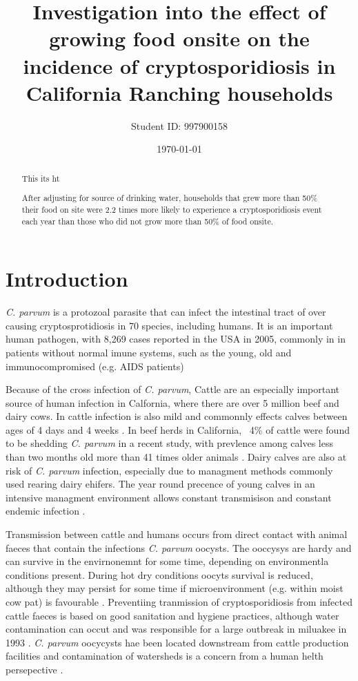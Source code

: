 \documentclass[12pt]{article}
\title{Investigation into the effect of growing food onsite on the incidence of cryptosporidiosis in California Ranching households}
\author{Student ID: 997900158}
\date{\today}
\begin{document}
	\maketitle
	\begin{abstract}
		This its ht 

		After adjusting for source of drinking water, households that grew more than 50\% their food  on site were 2.2 times more likely to experience a cryptosporidiosis event each year than those who did not grow more than 50\% of food onsite.

	\end{abstract}

\onehalfspace
	\section{Introduction} 
	\emph{C. parvum} is a protozoal parasite that can infect the intestinal tract of over causing cryptosprotidiosis in  70 species, \cite{Casemore1997} including humans.
	It is an important human pathogen, with 8,269 cases reported in the USA in 2005, commonly in in patients without normal imune systems, such as the young, old and immunocompromised (e.g. AIDS patients) \cite{Yoder2007}


	Because of the cross infection of \emph{C. parvum}, Cattle are an especially important source of human infection in Calfornia, where there are over 5 million beef and dairy cows. \cite{WesternFarm}
	In cattle infection is also mild and commonnly effects calves between ages of 4 days and 4 weeks \cite{malmo2010}. 
	In beef herds in California, ~4\% of cattle were found to be shedding \emph{C. parvum} in a recent study, with prevlence among calves less than two months old more than 41 times older animals \cite{Atwill1999a}.
	Dairy calves are also at risk of \emph{C. parvum} infection, especially due to managment methods commonly used rearing dairy ehifers. The year round precence of young calves in an intensive managment environment allows constant transmisison and constant endemic infection .\cite{Atwill1998}
	
	
	Transmission between cattle and humans occurs from direct contact with animal faeces that contain the infections \emph{C. parvum} oocysts\cite{malmo2010}.
	The ooccysys are hardy and can survive in the envirnonemnt for some time, depending on environmentla conditions present. 
	During hot dry conditions oocyts survival is reduced, although they may persist for some time if microenvironment (e.g. within moist cow pat) is favourable \cite{Robertson1992}.
	Preventiing tranmission of cryptosporidiosis from infected cattle faeces is based on good sanitation and hygiene practices\cite{malmo2010}, although water contamination can occut and was responsible for a large outbreak in miluakee in 1993 \cite{Kenzie1994}. 
	\emph{C. parvum} oocycysts hae been located downstream from cattle production facilities and contamination of watersheds is a concern from a human helth persepective \cite{Ong1996}. 
\end{document}
